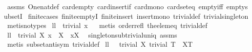 \begin{isabellebody}
%
\isatagproof
{}\isamarkupfalse%
\ assms\ One{\isacharunderscore}nat{\isacharunderscore}def\ card{\isacharunderscore}empty\ card{\isacharunderscore}insert{\isacharunderscore}if\ card{\isacharunderscore}mono\ card{\isacharunderscore}seteq\ empty{\isacharunderscore}iff\ empty{\isacharunderscore}subsetI\ \isanewline
finite{\isachardot}cases\ finite{\isachardot}emptyI\ finite{\isacharunderscore}insert\ insert{\isacharunderscore}mono\ trivial{\isacharunderscore}def\ trivial{\isacharunderscore}singleton\isanewline
{}\isamarkupfalse%
\ {\isacharparenleft}metis{\isacharparenleft}no{\isacharunderscore}types{\isacharparenright}{\isacharparenright}%
\endisatagproof
{\isafoldproof}%
%
\isadelimproof
\isanewline
%
\endisadelimproof
\isanewline
{}\isamarkupfalse%
\ ll{}{}{\isacharcolon}\ \ {\isachardoublequoteopen}trivial\ {\isacharbraceleft}x{\isacharbraceright}{\isachardoublequoteclose}%
\isadelimproof
\ %
\endisadelimproof
%
\isatagproof
{}\isamarkupfalse%
\ {\isacharparenleft}metis\ order{\isacharunderscore}refl\ the{\isacharunderscore}elem{\isacharunderscore}eq\ trivial{\isacharunderscore}def{\isacharparenright}%
\endisatagproof
{\isafoldproof}%
%
\isadelimproof
%
\endisadelimproof
\isanewline
\isanewline
{}\isamarkupfalse%
\ ll{}{}{\isacharcolon}\ \ {\isachardoublequoteopen}trivial\ X{\isachardoublequoteclose}\ {\isachardoublequoteopen}{\isacharbraceleft}x{\isacharbraceright}\ {\isasymsubseteq}\ X{\isachardoublequoteclose}\ \ {\isachardoublequoteopen}{\isacharbraceleft}x{\isacharbraceright}{\isacharequal}X{\isachardoublequoteclose}\ \isanewline
%
\isadelimproof
%
\endisadelimproof
%
\isatagproof
{}\isamarkupfalse%
\ singleton{\isacharunderscore}sub{\isacharunderscore}trivial{\isacharunderscore}uniq\ assms\ \isamarkupfalse%
\ {\isacharparenleft}metis\ subset{\isacharunderscore}antisym\ trivial{\isacharunderscore}def{\isacharparenright}%
\endisatagproof
{\isafoldproof}%
%
\isadelimproof
\isanewline
%
\endisadelimproof
\isanewline
{}\isamarkupfalse%
\ ll{}{}{\isacharcolon}\ \ {\isachardoublequoteopen}{\isasymnot}\ trivial\ X{\isachardoublequoteclose}\ {\isachardoublequoteopen}trivial\ T{\isachardoublequoteclose}\ \ {\isachardoublequoteopen}X{\isacharminus}T\ {\isasymnoteq}\ {\isacharbraceleft}{\isacharbraceright}{\isachardoublequoteclose}\isanewline
%
\isadelimproof
%
\endisadelimproof

\end{isabellebody}
